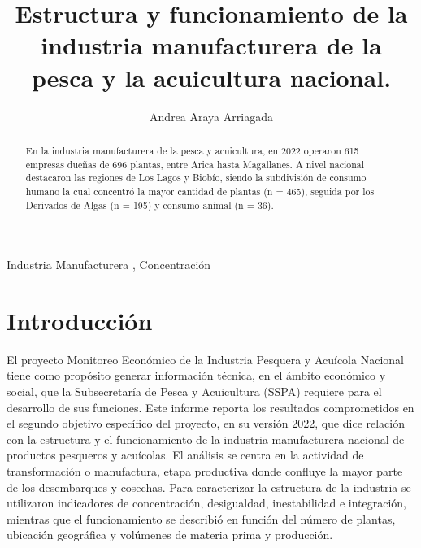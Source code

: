 \documentclass[
  super,
  preprint,
  3p]{elsarticle}
\begin{document}
\begin{frontmatter}
\title{Estructura y funcionamiento de la industria manufacturera de la
pesca y la acuicultura nacional.}
\author[1]{Andrea Araya Arriagada%
%
}



        
\begin{abstract}
En la industria manufacturera de la pesca y acuicultura, en 2022
operaron 615 empresas dueñas de 696 plantas, entre Arica hasta
Magallanes. A nivel nacional destacaron las regiones de Los Lagos y
Biobío, siendo la subdivisión de consumo humano la cual concentró la
mayor cantidad de plantas (n = 465), seguida por los Derivados de Algas
(n = 195) y consumo animal (n = 36).
\end{abstract}





\begin{keyword}
    Industria Manufacturera \sep 
    Concentración
\end{keyword}
\end{frontmatter}
    \ifdefined\Shaded\renewenvironment{Shaded}{\begin{tcolorbox}[enhanced, boxrule=0pt, sharp corners, interior hidden, borderline west={3pt}{0pt}{shadecolor}, breakable, frame hidden]}{\end{tcolorbox}}\fi

\hypertarget{introducciuxf3n}{%
\section{Introducción}\label{introducciuxf3n}}

El proyecto Monitoreo Económico de la Industria Pesquera y Acuícola
Nacional tiene como propósito generar información técnica, en el ámbito
económico y social, que la Subsecretaría de Pesca y Acuicultura (SSPA)
requiere para el desarrollo de sus funciones. Este informe reporta los
resultados comprometidos en el segundo objetivo específico del proyecto,
en su versión 2022, que dice relación con la estructura y el
funcionamiento de la industria manufacturera nacional de productos
pesqueros y acuícolas. El análisis se centra en la actividad de
transformación o manufactura, etapa productiva donde confluye la mayor
parte de los desembarques y cosechas. Para caracterizar la estructura de
la industria se utilizaron indicadores de concentración, desigualdad,
inestabilidad e integración, mientras que el funcionamiento se describió
en función del número de plantas, ubicación geográfica y volúmenes de
materia prima y producción.
\end{document}
